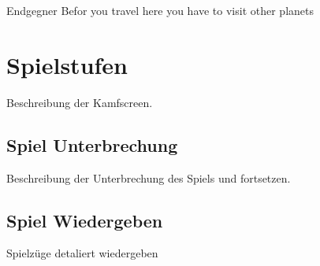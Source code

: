 \documentclass[fontsize=12pt,paper=a4,twoside]{scrartcl}
\begin{document}
Endgegner Befor you travel here you have to visit other planets




\section{Spielstufen}
Beschreibung der Kamfscreen.


\subsection{Spiel Unterbrechung}
Beschreibung der Unterbrechung des Spiels und fortsetzen.


\subsection{Spiel Wiedergeben}
Spielzüge detaliert wiedergeben
\end{document}

